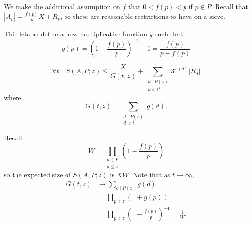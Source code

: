 \documentclass{article}
\begin{document}
We make the additional assumption on $f$ that $0 < f(p) < p$ if $p \in P$. Recall that $|A_p| = \frac{f(p)}{p} X + R_p$, so these are reasonable restrictions to have on a sieve.

This lets us define a new multiplicative function $g$ such that
\begin{equation*}
  g(p) = \left(1 - \frac{f(p)}{p}\right)^{-1} -1 = \frac{f(p)}{p - f(p)}
\end{equation*}
\begin{nthm}\label{thm:2.3}
  \begin{equation*}
    \forall t \quad S(A,P;z) \leq \frac{X}{G(t,z)} + \sum_{\substack{d \mid P(z) \\ d < t^2}} 3^{\omega(d)} |R_d|
  \end{equation*}
  where
  \begin{equation*}
    G(t,z) = \sum_{\substack{d \mid P(z) \\ d < t}} g(d).
  \end{equation*}
\end{nthm}
Recall
\begin{equation*}
  W = \prod_{\substack{p \in P \\ p \leq z}} \left(1 - \frac{f(p)}{p}\right)
\end{equation*}
so the expected size of $S(A,P;z)$ is $XW$. Note that as $t \to \infty$,
\begin{align*}
  G(t,z) &\to \sum_{d \mid P(z)} g(d) \\
         &= \prod_{p < z} (1 + g(p)) \\
         &= \prod_{p < z} \left(1 - \frac{f(p)}{p}\right)^{-1} = \frac{1}{W}.
\end{align*}
\end{document}
